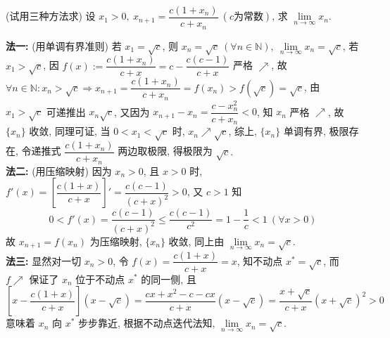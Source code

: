 \begin{example}
    (试用三种方法求) 设 $x_1>0,~x_{n+1}=\dfrac{c(1+x_n)}{c+x_n}~  (c \text{为常数})$, 求 $\lim\limits_{n\to\infty}x_n.$
\end{example}
\begin{solution}
    \textbf{法一: }(用单调有界准则) 若 $x_1=\sqrt{c}$, 则 $x_n=\sqrt{c}~  (\forall n\in\mathbb{N}),~\lim\limits_{n\to\infty}x_n=\sqrt{c}$, 
    若 $x_1>\sqrt{c}$, 因 $f(x):=\dfrac{c(1+x_n)}{c+x}=c-\dfrac{c(c-1)}{c+x}$ 严格 $\nearrow$, 故 $\forall n\in\mathbb{N}:x_n>\sqrt{c}\Rightarrow x_{n+1}=\dfrac{c(1+x_n)}{c+x_n}=f(x_n)>f\left(\sqrt{c}\right)=\sqrt{c}$, 
    由 $x_1>\sqrt{c}$ 可递推出 $x_n\sqrt{c}$, 又因为 $x_{n+1}-x_{n}=\dfrac{c-x_n^2}{c+x_n}<0$, 知 $x_n$ 严格 $\nearrow$, 故 $\{x_n\}$ 收敛, 
    同理可证, 当 $0<x_1<\sqrt{c}$ 时, $x_n\nearrow\sqrt{c}$, 综上, $\{x_n\}$ 单调有界, 极限存在, 令递推式 $\dfrac{c(1+x_n)}{c+x_n}$ 两边取极限, 得极限为 $\sqrt{c}.$\\
    \textbf{法二: }(用压缩映射) 因为 $x_n>0$, 且 $x>0$ 时, $f'(x)=\left[\dfrac{c(1+x)}{c+x}\right]'=\dfrac{c(c-1)}{(c+x)^2}>0$, 又 $c>1$ 知
    $$0<f'(x)=\dfrac{c(c-1)}{(c+x)^2}\leqslant\dfrac{c(c-1)}{c^2}=1-\dfrac{1}{c}<1~  (\forall x>0)$$
    故 $x_{n+1}=f(x_n)$ 为压缩映射, $\{x_n\}$ 收敛, 同上由 $\lim\limits_{n\to\infty}x_n=\sqrt{c}.$\\
    \textbf{法三: }显然对一切 $x_n>0$, 令 $f(x)=\dfrac{c(1+x)}{c+x}=x$, 知不动点 $x^*=\sqrt{c}$, 而 $f\nearrow$ 保证了 $x_n$ 位于不动点 $x^*$ 的同一侧, 且
    $$\left[x-\dfrac{c(1+x)}{c+x}\right]\left(x-\sqrt{c}\right)=\dfrac{cx+x^2-c-cx}{c+x}\left(x-\sqrt{c}\right)=\dfrac{x+\sqrt{c}}{c+x}\left(x+\sqrt{c}\right)^2>0$$
    意味着 $x_n$ 向 $x^*$ 步步靠近, 根据不动点迭代法知, $\lim\limits_{n\to\infty}x_n=\sqrt{c}.$
\end{solution}


